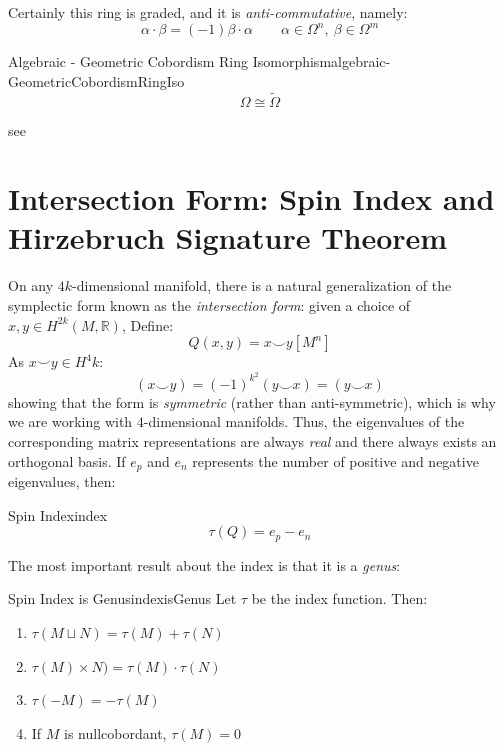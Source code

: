 \documentclass{ut-thesis}
\newenvironment{Proof}[1][]
  {\begin{ProofTcb}[#1]}
  {\end{ProofTcb}}
\newcommand{\R}{{\mathbb{R}}}
\newcommand{\dcup}{\sqcup}
\begin{document}
Certainly this ring is graded, and it is \emph{anti-commutative}, namely:
\[
  \alpha\cdot \beta = (-1)\beta\cdot\alpha \qquad \alpha \in \Omega^n,\ \beta \in \Omega^m
\]

\begin{thm}{Algebraic - Geometric Cobordism Ring Isomorphism}{algebraic-GeometricCobordismRingIso}
  \[
    \Omega \cong \widetilde{\Omega}
  \]
\end{thm}

\begin{Proof}
  see~\cite[section~7]{hirzebruchTopologicalMethodsAlgebraic1995}
\end{Proof}


\section{Intersection Form: Spin Index and Hirzebruch Signature Theorem}\label{sec:index}

On any $4k$-dimensional manifold, there is a natural generalization of the symplectic form known as the
\emph{intersection form}: given a choice of $x,y \in H^{2k}(M, \R)$, Define:
\[
  Q(x,y) = x\smile y[M^n]
\]
As $x\smile y \in H^4k$:
\[
  (x\smile y) = (-1)^{k^2}(y\smile x) = (y\smile x)
\]
showing that the form is \emph{symmetric} (rather than anti-symmetric), which is why we are working with
$4$-dimensional manifolds. Thus, the eigenvalues of the corresponding matrix representations are always
\emph{real} and there always exists an orthogonal basis. If $e_p$ and $e_n$ represents the number of positive
and negative eigenvalues, then:
\begin{defn}{Spin Index}{index}
  \[
  \tau(Q) = e_p - e_n
\]
\end{defn}

The most important result about the index is that it is a \emph{genus}:

\begin{thm}{Spin Index is Genus}{indexisGenus}
  Let $\tau$ be the index function. Then:
  \begin{enumerate}
    \item $\tau(M\dcup N) = \tau(M) + \tau(N)$
    \item $\tau(M)\times N) =\tau(M)\cdot \tau(N)$
    \item $\tau(-M) = -\tau(M)$
    \item If $M$ is nullcobordant, $\tau(M) = 0$
  \end{enumerate}
\end{thm}
\end{document}
